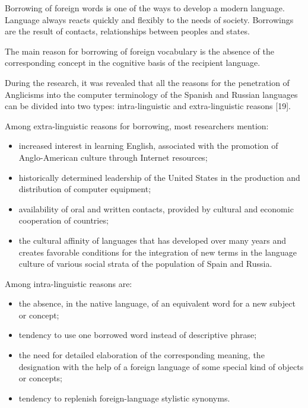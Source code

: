 \documentclass[12pt, a4paper, twoside]{report}
\begin{document}
Borrowing of foreign words is one of the ways to develop a modern language. Language always reacts quickly and flexibly to the needs of society. Borrowings are the result of contacts, relationships between peoples and states.

The main reason for borrowing of foreign vocabulary is the absence of the corresponding concept in the cognitive basis of the recipient language.

During the research, it was revealed that all the reasons for the penetration of Anglicisms into the computer terminology of the Spanish and Russian languages can be divided into two types: intra-linguistic and extra-linguistic reasons [19].

Among extra-linguistic reasons for borrowing, most researchers mention: 
\begin{itemize}
    \item increased interest in learning English, associated with the promotion of Anglo-American culture through Internet resources; 
    \item historically determined leadership of the United States in the production and distribution of computer equipment; 
    \item availability of oral and written contacts, provided by cultural and economic cooperation of countries; 
    \item the cultural affinity of languages that has developed over many years and creates favorable conditions for the integration of new terms in the language culture of various social strata of the population of Spain and Russia.\\
\end{itemize}

Among intra-linguistic reasons are:\\

\begin{itemize}
    \item the absence, in the native language, of an equivalent word for a new subject or concept;
    \item tendency to use one borrowed word instead of descriptive phrase;
    \item the need for detailed elaboration of the corresponding meaning, the designa\-tion with the help of a foreign language of some special kind of objects or concepts;
    \item tendency to replenish foreign-language stylistic synonyms.\\
\end{itemize}
\end{document}
